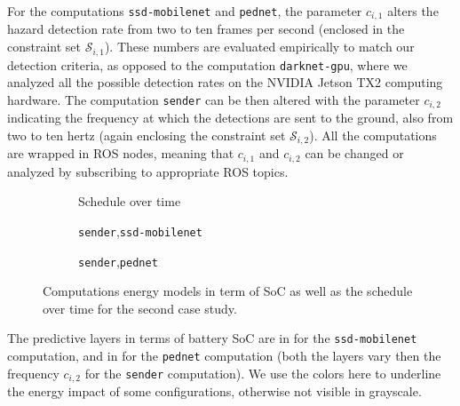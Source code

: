 For the computations {\small\tt ssd-mobilenet} and {\small\tt pednet}, the parameter $c_{i,1}$ alters the hazard detection rate from two to ten frames per second (enclosed in the constraint set $\mathcal{S}_{i,1}$). These numbers are evaluated empirically to match our detection criteria, as opposed to the computation {\small\tt darknet-gpu}, where we analyzed all the possible detection rates on the NVIDIA Jetson TX2 computing hardware. The computation {\small\tt sender} can be then altered with the parameter $c_{i,2}$ indicating the frequency at which the detections are sent to the ground, also from two to ten hertz (again enclosing the constraint set $\mathcal{S}_{i,2}$). All the computations are wrapped in ROS nodes, meaning that $c_{i,1}$ and $c_{i,2}$ can be changed or analyzed by subscribing to appropriate ROS topics.
\begin{figure}[h!]
  \centering
  \selectfont
  \footnotesize    
  \begin{subfigure}[b]{0.33\textwidth}
    \centering
    
    \caption{Schedule over time}
    \label{fig:max-qos}
  \end{subfigure}
  \begin{subfigure}[b]{0.32\textwidth}
    \centering
    
    \caption{{\tt\small sender},{\tt\small ssd-mobilenet}}
    \label{fig:mobilenet}
  \end{subfigure}
  \begin{subfigure}[b]{0.32\textwidth}
    \centering
    
    \caption{{\tt\small sender},{\tt\small pednet}}
    \label{fig:pednet}
  \end{subfigure}
  \caption[Computations energy models in term of SoC as well as the schedule over time]{Computations energy models in term of SoC as well as the schedule over time for the second case study.}
  \label{fig:computational}
\end{figure}
The predictive layers in terms of battery SoC are in  for the {\small\tt ssd-mobilenet} computation, and in  for the {\small\tt pednet} computation (both the layers vary then the frequency $c_{i,2}$ for the {\small\tt sender} computation). We use the colors here to underline the energy impact of some configurations, otherwise not visible in grayscale.

